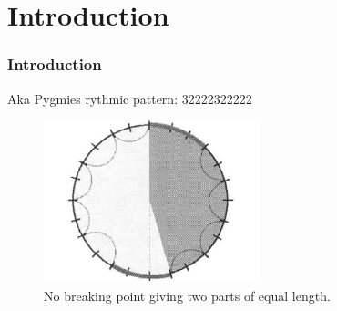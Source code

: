 \documentclass{beamer}
\theoremstyle{definition}
\begin{document}
%
%
%


\section{Introduction}

\begin{frame}
\frametitle{Introduction}
Aka Pygmies rythmic pattern: 32222322222
\begin{figure}[h!]
\includegraphics[scale=0.5]{circulo}
\caption{No breaking point giving two parts of equal length.}
\end{figure}
\end{frame}
\end{document}
